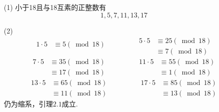 \documentclass[UTF8]{ctexart}
\begin{document}
\subsection{}   %
\begin{enumerate}
    \item [(1)]小于18且与18互素的正整数有
    \[
        1,5,7,11,13,17  
    \]
    \item [(2)]
    \[
        \begin{aligned}
            1\cdot 5 
            & \equiv 5 (\bmod 18)\\
            &
        \end{aligned}    
        \qquad \qquad
        \begin{aligned}
            5\cdot 5 
            & \equiv 25 (\bmod 18)\\
            & \equiv 7 (\bmod 18)
        \end{aligned}
    \]
    \[
        \begin{aligned}
            7\cdot 5
            & \equiv 35 (\bmod 18)\\
            & \equiv 17 (\bmod 18)
        \end{aligned}
        \qquad \qquad
        \begin{aligned}
            11\cdot 5 
            & \equiv 55 (\bmod 18)\\
            & \equiv 1 (\bmod 18)
        \end{aligned}  
    \]
    \[
        \begin{aligned}
            13\cdot 5 
            & \equiv 65 (\bmod 18)\\
            & \equiv 11 (\bmod 18)
        \end{aligned}
        \qquad \qquad
        \begin{aligned}
            17\cdot 5
            & \equiv 85 (\bmod 18)\\
            & \equiv 13 (\bmod 18)
        \end{aligned}
    \]
    仍为缩系，引理$2.1$成立.
\end{enumerate}
\end{document}
